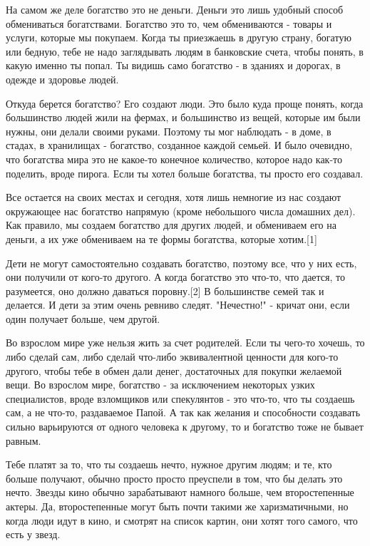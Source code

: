 \documentclass[ebook,12pt,oneside,openany]{memoir}
\begin{document}
На самом же деле богатство это не деньги. Деньги это лишь удобный
способ обмениваться богатствами. Богатство это то, чем обмениваются -
товары и услуги, которые мы покупаем. Когда ты приезжаешь в другую
страну, богатую или бедную, тебе не надо заглядывать людям в
банковские счета, чтобы понять, в какую именно ты попал. Ты видишь
само богатство - в зданиях и дорогах, в одежде и здоровье людей.

Откуда берется богатство? Его создают люди. Это было куда проще
понять, когда большинство людей жили на фермах, и большинство из
вещей, которые им были нужны, они делали своими руками. Поэтому ты мог
наблюдать - в доме, в стадах, в хранилищах - богатство, созданное
каждой семьей. И было очевидно, что богатства мира это не какое-то
конечное количество, которое надо как-то поделить, вроде пирога. Если
ты хотел больше богатства, ты просто его создавал.

Все остается на своих местах и сегодня, хотя лишь немногие из нас
создают окружающее нас богатство напрямую (кроме небольшого числа
домашних дел). Как правило, мы создаем богатство для других людей, и
обмениваем его на деньги, а их уже обмениваем на те формы богатства,
которые хотим.[1]

Дети не могут самостоятельно создавать богатство, поэтому все, что у
них есть, они получили от кого-то другого. А когда богатство это
что-то, что дается, то разумеется, оно должно даваться поровну.[2] В
большинстве семей так и делается. И дети за этим очень ревниво следят.
"Нечестно!" - кричат они, если один получает больше, чем другой.

Во взрослом мире уже нельзя жить за счет родителей. Если ты чего-то
хочешь, то либо сделай сам, либо сделай что-либо эквивалентной
ценности для кого-то другого, чтобы тебе в обмен дали денег,
достаточных для покупки желаемой вещи. Во взрослом мире, богатство -
за исключением некоторых узких специалистов, вроде взломщиков или
спекулянтов - это что-то, что ты создаешь сам, а не что-то,
раздаваемое Папой. А так как желания и способности создавать сильно
варьируются от одного человека к другому, то и богатство тоже не
бывает равным.

Тебе платят за то, что ты создаешь нечто, нужное другим людям; и те,
кто больше получают, обычно просто просто преуспели в том, что бы
делать это нечто. Звезды кино обычно зарабатывают намного больше, чем
второстепенные актеры. Да, второстепенные могут быть почти такими же
харизматичными, но когда люди идут в кино, и смотрят на список картин,
они хотят того самого, что есть у звезд.
\end{document}

